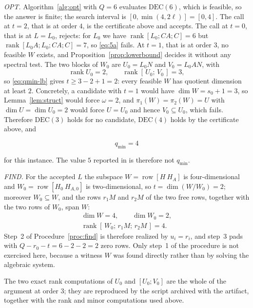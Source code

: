 \documentclass[journal]{IEEEtran}
\theoremstyle{plainn}
\theoremstyle{remark}
\begin{document}
\emph{OPT.} Algorithm~\ref{alg:opt} with $Q=6$ evaluates $\mathrm{DEC}(6)$, which is feasible, so the
answer is finite; the search interval is $[0,\min(4,2\ell)]=[0,4]$. The call at $t=2$, that is at
order $4$, is the certificate above and accepts. The call at $t=0$, that is at $L=L_0$, rejects: for
$L_0$ we have $\operatorname{rank}[L_0;CA;C]=6$ but $\operatorname{rank}[L_0A;L_0;CA;C]=7$, so
\eqref{eq:5a} fails. At $t=1$, that is at order $3$, no feasible $W$ exists, and Proposition~\ref{prop:lowerbound}
decides it without any spectral test. The two blocks of $W_0$ are $U_0=L_0N$ and $V_0=L_0AN$, with
\begin{equation*}
\operatorname{rank}U_0=2,\qquad \operatorname{rank}[\,U_0;\,V_0\,]=3,
\end{equation*}
so \eqref{eq:qmin-lb} gives $t\ge3-2+1=2$: every feasible $W$ has quotient dimension at least $2$.
Concretely, a candidate with $t=1$ would have $\dim W=s_0+1=3$, so Lemma~\ref{lem:struct} would force
$\omega=2$, and $\pi_1(W)=\pi_2(W)=U$ with $\dim U=\dim U_0=2$ would force $U=U_0$ and hence
$V_0\subseteq U_0$, which fails. Therefore $\mathrm{DEC}(3)$ holds for no candidate, $\mathrm{DEC}(4)$
holds by the certificate above, and

\begin{equation*}
q_{\min}=4
\end{equation*}

for this instance. The value $5$ reported in \cite[Sec.~VII]{fer26b} is therefore not $q_{\min}$.

\emph{FIND.} For the accepted $L$ the subspace $W=\operatorname{row}[H\ H_A]$ is four-dimensional and
$W_0=\operatorname{row}[H_0\ H_{A,0}]$ is two-dimensional, so $t=\dim(W/W_0)=2$; moreover $W_0\subseteq
W$, and the rows $r_1M$ and $r_2M$ of the two free rows, together with the two rows of $W_0$, span
$W$:
\begin{equation*}
\begin{gathered}
\dim W=4,\qquad \dim W_0=2,\\
\operatorname{rank}[\,W_0;\,r_1M;\,r_2M\,]=4 .
\end{gathered}
\end{equation*}
Step~2 of Procedure~\ref{proc:find} is therefore realized by $u_i=r_i$, and step~3 pads with
$Q-r_0-t=6-2-2=2$ zero rows. Only step~1 of the procedure is not exercised here, because a witness
$W$ was found directly rather than by solving the algebraic system.

The two exact rank computations of $U_0$ and $[U_0;V_0]$ are the whole of the argument at order
$3$; they are reproduced by the script archived with the artifact, together with the rank and
minor computations used above.
\end{document}
